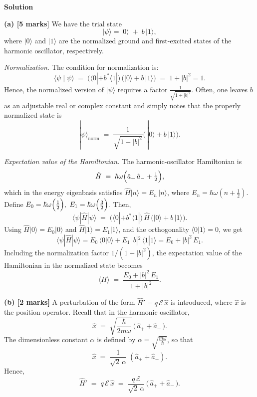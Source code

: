 \documentclass{article}
\begin{document}
\textbf{Solution}

\textbf{(a) [5 marks]} 
We have the trial state 
\[
|\psi\rangle = |0\rangle \;+\; b\,|1\rangle,
\]
where \(|0\rangle\) and \(|1\rangle\) are the normalized ground and first-excited states of the harmonic oscillator, respectively. 

\textit{Normalization.} The condition for normalization is:
\[
\langle \psi \mid \psi \rangle \;=\; 
\bigl(\langle 0| + b^*\langle 1|\bigr)\,\bigl(|0\rangle + b\,|1\rangle\bigr) 
\;=\; 1 + |b|^2 = 1.
\]
Hence, the normalized version of \(|\psi\rangle\) requires a factor 
\(\frac{1}{\sqrt{1+|b|^2}}\).
Often, one leaves \(b\) as an adjustable real or complex constant and simply notes 
that the properly normalized state is
\[
|\psi\rangle_{\mathrm{norm}} \;=\; \frac{1}{\sqrt{1 + |b|^2}}\bigl(\,|0\rangle + b\,|1\rangle\bigr).
\]

\textit{Expectation value of the Hamiltonian.} The harmonic-oscillator Hamiltonian is
\[
\hat{H} \;=\; \hbar\omega\Bigl(\hat{a}_+\,\hat{a}_- + \tfrac{1}{2}\Bigr),
\]
which in the energy eigenbasis satisfies \(\hat{H}|n\rangle = E_n\,|n\rangle\), where 
\(E_n = \hbar\omega\left(n + \tfrac{1}{2}\right)\).
Define 
\(
E_0 = \hbar\omega\Bigl(\tfrac{1}{2}\Bigr),
\)
\(
E_1 = \hbar\omega\Bigl(\tfrac{3}{2}\Bigr).
\)
Then,
\[
\langle \psi | \hat{H} | \psi \rangle \;=\; 
\bigl(\langle 0| + b^*\langle 1|\bigr)\,\hat{H}\,\bigl(|0\rangle + b\,|1\rangle\bigr).
\]
Using \(\hat{H}|0\rangle = E_0|0\rangle\) and \(\hat{H}|1\rangle = E_1|1\rangle\), and the orthogonality \(\langle 0|1\rangle=0\), we get
\[
\langle \psi | \hat{H} | \psi \rangle 
= E_0\,\langle 0|0\rangle + E_1\,|b|^2\,\langle 1|1\rangle 
= E_0 + |b|^2\,E_1.
\]
Including the normalization factor \(1/(1 + |b|^2)\), the expectation value of the Hamiltonian in the normalized state becomes
\[
\langle H \rangle \;=\; 
\frac{E_0 + |b|^2\,E_1}{\,1 + |b|^2\,}.
\]

\textbf{(b) [2 marks]} 
A perturbation of the form 
\(
\hat{H}' = q\,\mathcal{E}\,\hat{x}
\)
is introduced, where \(\hat{x}\) is the position operator. Recall that in the harmonic oscillator,
\[
\hat{x}
\;=\;
\sqrt{\frac{\hbar}{2m\omega}}\,\bigl(\,\hat{a}_+ + \hat{a}_-\,\bigr).
\]
The dimensionless constant \(\alpha\) is defined by \(\alpha = \sqrt{\tfrac{m\omega}{\hbar}}\), so that
\[
\hat{x}
\;=\;
\frac{1}{\sqrt{2}\,\alpha}\;(\hat{a}_+ + \hat{a}_-).
\]
Hence,
\[
\hat{H}'
\;=\;
q\,\mathcal{E}\,\hat{x}
\;=\;
\frac{q\,\mathcal{E}}{\sqrt{2}\,\alpha}\,\bigl(\,\hat{a}_+ + \hat{a}_-\,\bigr).
\]
\end{document}
